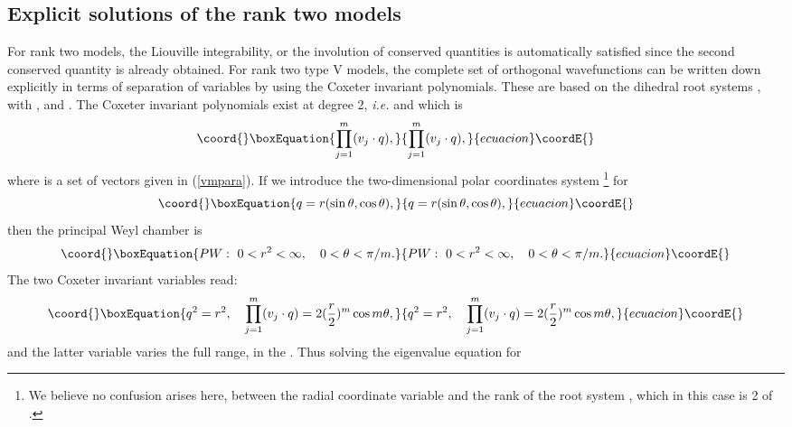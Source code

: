 \documentclass[a4paper,12pt]{article}
\begin{document}
\subsection{Explicit solutions of the rank two models}
\label{ranktwo}
For rank two models, the Liouville integrability, or the involution of
conserved quantities is automatically satisfied since the second conserved
quantity is already obtained.
For rank two type V models, the complete set of orthogonal wavefunctions
can be  written down explicitly in terms of separation of variables by
using the Coxeter invariant polynomials.
These are based on the dihedral root systems \coordHE{}, with
\coordHE{} \cite{Cal1},
\coordHE{} and \coordHE{} \cite{G2sep}.
The Coxeter invariant polynomials exist at degree 2, {\em i.e.\/}
\coordHE{} and \coordHE{}
which is
\begin{equation}\coord{}\boxEquation{
   \prod_{j=1}^m(v_j\cdot q),
}{
   \prod_{j=1}^m(v_j\cdot q),
}{ecuacion}\coordE{}\end{equation}
where \coordHE{} is a set of vectors given in (\ref{vmpara}).
If we introduce the two-dimensional polar coordinates system
\footnote{We believe no confusion arises here, between the radial coordinate
variable \coordHE{} and the rank of the root system \coordHE{}, which in this case is
2
of \coordHE{}.}
for \coordHE{}
\begin{equation}\coord{}\boxEquation{
   q=r(\sin\theta,\cos\theta),
}{
   q=r(\sin\theta,\cos\theta),
}{ecuacion}\coordE{}\end{equation}
then the principal Weyl chamber is
\begin{equation}\coord{}\boxEquation{
   PW:\ 0<r^2<\infty,\quad 0<\theta<\pi/m.
}{
   PW:\ 0<r^2<\infty,\quad 0<\theta<\pi/m.
}{ecuacion}\coordE{}\end{equation}
The two Coxeter invariant variables read:
\begin{equation}\coord{}\boxEquation{
   q^2=r^2,\quad \prod_{j=1}^m(v_j\cdot q)=2({r\over2})^m\cos m\theta,
}{
   q^2=r^2,\quad \prod_{j=1}^m(v_j\cdot q)=2({r\over2})^m\cos m\theta,
}{ecuacion}\coordE{}\end{equation}
and the latter variable varies the full range, \coordHE{}
in the \coordHE{}.
Thus solving the eigenvalue equation for \coordHE{}
\end{document}
